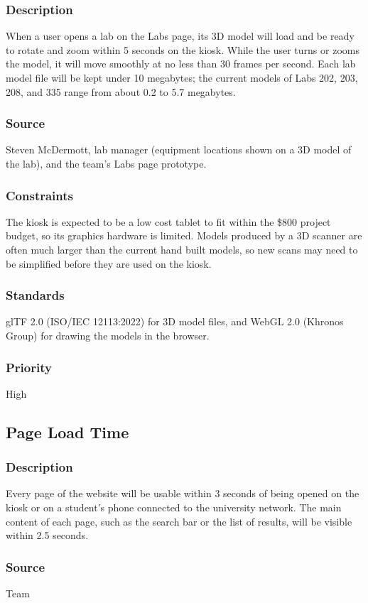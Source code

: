 \subsubsection{Description}
When a user opens a lab on the Labs page, its 3D model will load and be ready to rotate and zoom within 5 seconds on the kiosk. While the user turns or zooms the model, it will move smoothly at no less than 30 frames per second. Each lab model file will be kept under 10 megabytes; the current models of Labs 202, 203, 208, and 335 range from about 0.2 to 5.7 megabytes.
\subsubsection{Source}
Steven McDermott, lab manager (equipment locations shown on a 3D model of the lab), and the team's Labs page prototype.
\subsubsection{Constraints}
The kiosk is expected to be a low cost tablet to fit within the \$800 project budget, so its graphics hardware is limited. Models produced by a 3D scanner are often much larger than the current hand built models, so new scans may need to be simplified before they are used on the kiosk.
\subsubsection{Standards}
glTF 2.0 (ISO/IEC 12113:2022) for 3D model files, and WebGL 2.0 (Khronos Group) for drawing the models in the browser.
\subsubsection{Priority}
High

\subsection{Page Load Time}
\subsubsection{Description}
Every page of the website will be usable within 3 seconds of being opened on the kiosk or on a student's phone connected to the university network. The main content of each page, such as the search bar or the list of results, will be visible within 2.5 seconds.
\subsubsection{Source}
Team
